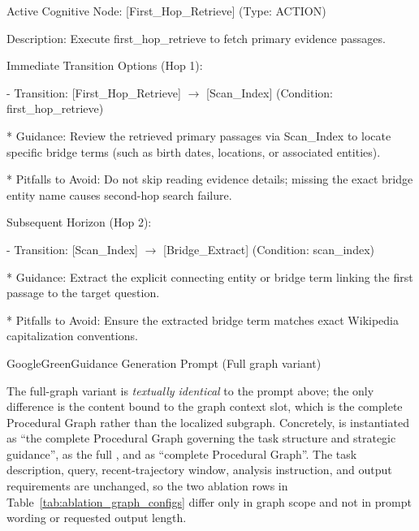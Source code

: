 \begin{tcolorbox}[colback=GoogleGreen!3,colframe=GoogleGreen,colbacktitle=GoogleGreen,coltitle=white,fonttitle=\bfseries,title={Serialized Local Graph Context (HotpotQA; excerpt)},arc=3pt,outer arc=3pt,boxrule=0.8pt,left=8pt,right=8pt,top=6pt,bottom=6pt,before skip=8pt,after skip=8pt,breakable=false]
\footnotesize\raggedright\ttfamily
Active Cognitive Node: [First\_Hop\_Retrieve] (Type: ACTION)\par
Description: Execute first\_hop\_retrieve to fetch primary evidence passages.\par
\smallskip
Immediate Transition Options (Hop 1):\par
- Transition: [First\_Hop\_Retrieve] $\rightarrow$ [Scan\_Index] (Condition: first\_hop\_retrieve)\par
* Guidance: Review the retrieved primary passages via Scan\_Index to locate specific bridge terms (such as birth dates, locations, or associated entities).\par
* Pitfalls to Avoid: Do not skip reading evidence details; missing the exact bridge entity name causes second-hop search failure.\par
\smallskip
Subsequent Horizon (Hop 2):\par
- Transition: [Scan\_Index] $\rightarrow$ [Bridge\_Extract] (Condition: scan\_index)\par
* Guidance: Extract the explicit connecting entity or bridge term linking the first passage to the target question.\par
* Pitfalls to Avoid: Ensure the extracted bridge term matches exact Wikipedia capitalization conventions.\par
\end{tcolorbox}

\begin{tracebox}{GoogleGreen}{Guidance Generation Prompt (Full graph variant)}
\footnotesize\raggedright
The full-graph variant is \emph{textually identical} to the prompt above; the only difference is the content bound to the graph context slot, which is the complete Procedural Graph rather than the localized subgraph. Concretely,  is instantiated as ``the complete Procedural Graph governing the task structure and strategic guidance'',  as the full , and  as ``complete Procedural Graph''. The task description, query, recent-trajectory window, analysis instruction, and output requirements are unchanged, so the two ablation rows in Table~\ref{tab:ablation_graph_configs} differ only in graph scope and not in prompt wording or requested output length.
\end{tracebox}

